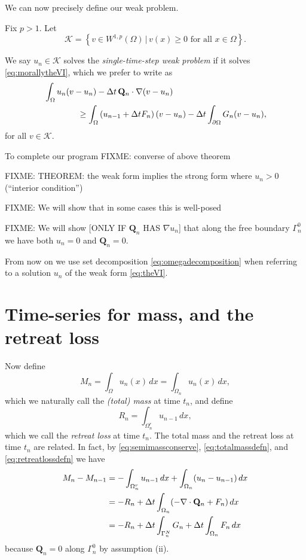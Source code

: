 \documentclass[final,leqno,onefignum,onetabnum]{siamltex1213bueler}
\newcommand\bQ{\mathbf{Q}}
\newcommand{\Div}{\nabla\cdot}
\renewcommand{\grad}{\nabla}
\begin{document}
\medskip
We can now precisely define our weak problem.

\medskip
\begin{definition}  Fix $p>1$.  Let
    $$\mathcal{K} = \left\{v \in W^{1,p}(\Omega) \,\big|\, v(x) \ge 0 \text{ for all } x \in \Omega\right\}.$$
\end{definition}

\begin{definition}  We say $u_n \in \mathcal{K}$ solves the \emph{single-time-step weak problem} if it solves \eqref{eq:morallytheVI}, which we prefer to write as
\begin{align}
&\int_{\Omega} u_n (v-u_n) - \Delta t\, \bQ_n \cdot \grad(v-u_n)  \label{eq:theVI} \\
  &\qquad\qquad \ge \int_{\Omega} \left(u_{n-1} + \Delta t F_n\right) (v-u_n) - \Delta t \int_{\partial \Omega} G_n (v-u_n),  \notag
\end{align}
for all $v \in \mathcal{K}$.
\end{definition}

To complete our program FIXME: converse of above theorem

FIXME: THEOREM: the weak form implies the strong form where $u_n>0$ (``interior condition'')

FIXME:  We will show that in some cases this is well-posed

FIXME:  We will show [ONLY IF $\bQ_n$ HAS $\grad u_n$] that along the free boundary $\Gamma_n^0$ we have both $u_n=0$ and $\bQ_n = 0$.

From now on we use set decomposition \eqref{eq:omegadecomposition} when referring to a solution $u_n$ of the weak form \eqref{eq:theVI}.


\section{Time-series for mass, and the retreat loss}  \label{sec:timeseries}

Now define
\begin{equation}
M_n = \int_\Omega u_n(x)\,dx = \int_{\Omega_n} u_n(x)\,dx, \label{eq:totalmassdefn}
\end{equation}
which we naturally call the \emph{(total) mass} at time $t_n$, and define
\begin{equation}
R_n = \int_{\Omega_n^r} u_{n-1}\,dx, \label{eq:retreatlossdefn}
\end{equation}
which we call the \emph{retreat loss} at time $t_n$.  The total mass and the retreat loss at time $t_n$ are related.  In fact, by \eqref{eq:semimassconserve}, \eqref{eq:totalmassdefn}, and \eqref{eq:retreatlossdefn} we have
\begin{align}
M_n - M_{n-1} &=  - \int_{\Omega_n^r} u_{n-1}\,dx + \int_{\Omega_n} (u_n - u_{n-1})\,dx \label{eq:massstep} \\
   &= - R_n + \Delta t \int_{\Omega_n} (- \Div \bQ_n + F_n) \,dx \notag \\
   &= - R_n + \Delta t \int_{\Gamma_n^N} G_n + \Delta t \int_{\Omega_n} F_n\,dx \notag
\end{align}
because $\bQ_n=0$ along $\Gamma_n^0$ by assumption (ii).
\end{document}
